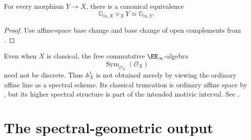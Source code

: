 \begin{proposition}
\label{prop:multiplicative-group-base-change}
For every morphism $Y\to X$, there is a canonical equivalence
\[
    \mathbb G_{m,X}
    \times_X
    Y
    \simeq
    \mathbb G_{m,Y}.
\]
\end{proposition}

\begin{proof}
Use affine-space base change and base change of open complements from
.
\end{proof}

\begin{remark}
\label{rem:affine-line-genuinely-spectral}
Even when $X$ is classical, the free commutative $\EE_\infty$-algebra
\[
    \operatorname{Sym}_{\mathcal O_X}(\mathcal O_X)
\]
need not be discrete. Thus $\mathbb A_X^1$ is not obtained merely by
viewing the ordinary affine line as a spectral scheme. Its classical
truncation is ordinary affine space by
, but its higher spectral
structure is part of the intended motivic interval. See
\cite{KhanBraveNewMotivicI}.
\end{remark}



\section{The spectral-geometric output}
\label{sec:spectral-geometric-output}

